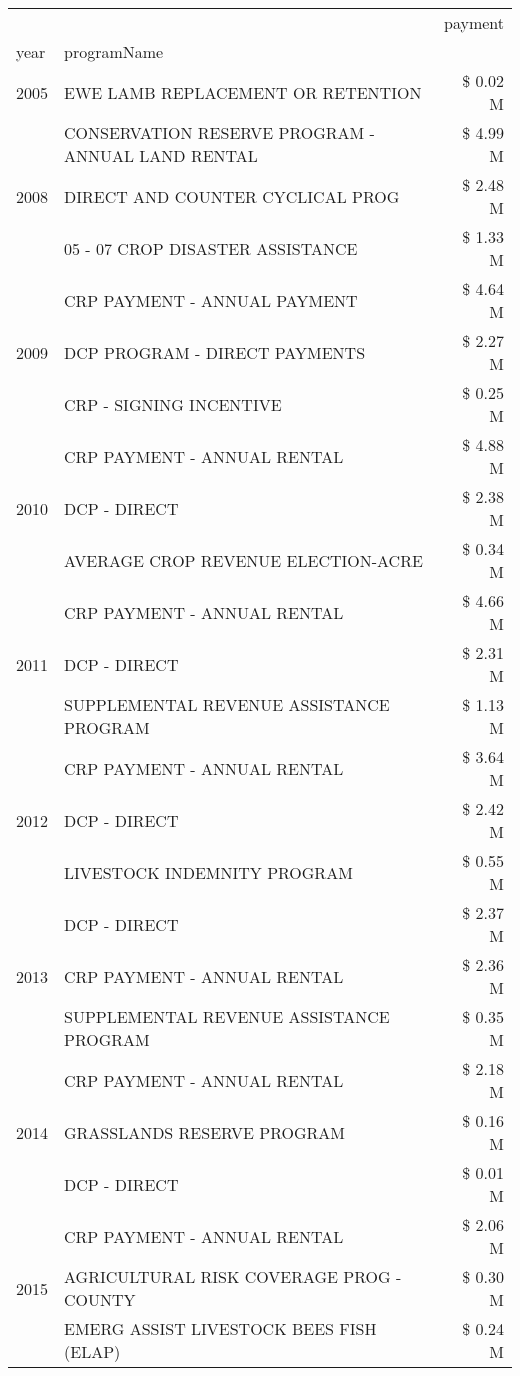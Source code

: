 \begin{tabular}{llr}
\toprule
 &  & payment \\
year & programName &  \\
\midrule
2005 & EWE LAMB REPLACEMENT OR RETENTION & \$ 0.02 M \\
\cline{1-3}
\multirow[t]{3}{*}{2008} & CONSERVATION RESERVE PROGRAM - ANNUAL LAND RENTAL & \$ 4.99 M \\
 & DIRECT AND COUNTER CYCLICAL PROG & \$ 2.48 M \\
 & 05 - 07 CROP DISASTER ASSISTANCE & \$ 1.33 M \\
\cline{1-3}
\multirow[t]{3}{*}{2009} & CRP PAYMENT - ANNUAL PAYMENT & \$ 4.64 M \\
 & DCP PROGRAM - DIRECT PAYMENTS & \$ 2.27 M \\
 & CRP - SIGNING INCENTIVE & \$ 0.25 M \\
\cline{1-3}
\multirow[t]{3}{*}{2010} & CRP PAYMENT - ANNUAL RENTAL & \$ 4.88 M \\
 & DCP - DIRECT & \$ 2.38 M \\
 & AVERAGE CROP REVENUE ELECTION-ACRE & \$ 0.34 M \\
\cline{1-3}
\multirow[t]{3}{*}{2011} & CRP PAYMENT - ANNUAL RENTAL & \$ 4.66 M \\
 & DCP - DIRECT & \$ 2.31 M \\
 & SUPPLEMENTAL REVENUE ASSISTANCE PROGRAM & \$ 1.13 M \\
\cline{1-3}
\multirow[t]{3}{*}{2012} & CRP PAYMENT - ANNUAL RENTAL & \$ 3.64 M \\
 & DCP - DIRECT & \$ 2.42 M \\
 & LIVESTOCK INDEMNITY PROGRAM & \$ 0.55 M \\
\cline{1-3}
\multirow[t]{3}{*}{2013} & DCP - DIRECT & \$ 2.37 M \\
 & CRP PAYMENT - ANNUAL RENTAL & \$ 2.36 M \\
 & SUPPLEMENTAL REVENUE ASSISTANCE PROGRAM & \$ 0.35 M \\
\cline{1-3}
\multirow[t]{3}{*}{2014} & CRP PAYMENT - ANNUAL RENTAL & \$ 2.18 M \\
 & GRASSLANDS RESERVE PROGRAM & \$ 0.16 M \\
 & DCP - DIRECT & \$ 0.01 M \\
\cline{1-3}
\multirow[t]{3}{*}{2015} & CRP PAYMENT - ANNUAL RENTAL & \$ 2.06 M \\
 & AGRICULTURAL RISK COVERAGE PROG - COUNTY & \$ 0.30 M \\
 & EMERG ASSIST LIVESTOCK BEES FISH (ELAP) & \$ 0.24 M \\

\end{tabular}
